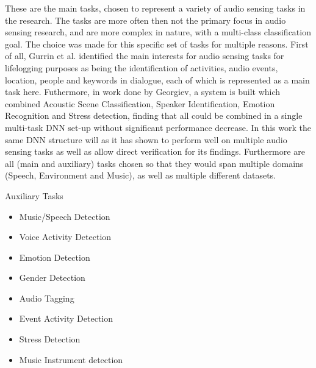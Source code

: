 
	
	These are the main tasks, chosen to represent a variety of audio sensing tasks in the research. The tasks are more often then not the primary focus in audio sensing research, and are more complex in nature, with a multi-class classification goal. The choice was made for this specific set of tasks for multiple reasons. First of all, Gurrin et al. identified the main interests for audio sensing tasks for lifelogging purposes as being the identification of activities, audio events, location, people and keywords in dialogue, each of which is represented as a main task here. Futhermore, in work done by Georgiev, a system is built which combined Acoustic Scene Classification, Speaker Identification, Emotion Recognition and Stress detection, finding that all could be combined in a single multi-task DNN set-up without significant performance decrease. In this work the same DNN structure will as it has shown to perform well on multiple audio sensing tasks as well as allow direct verification for its findings. Furthermore are all (main and auxiliary) tasks chosen so that they would span multiple domains (Speech, Environment and Music), as well as multiple different datasets. 


	Auxiliary Tasks\\
	
	\begin{itemize}
		\item Music/Speech Detection
		\item Voice Activity Detection
		\item Emotion Detection
		\item Gender Detection
		\item Audio Tagging
		\item Event Activity Detection
		\item Stress Detection
		\item Music Instrument detection
	\end{itemize}
	
